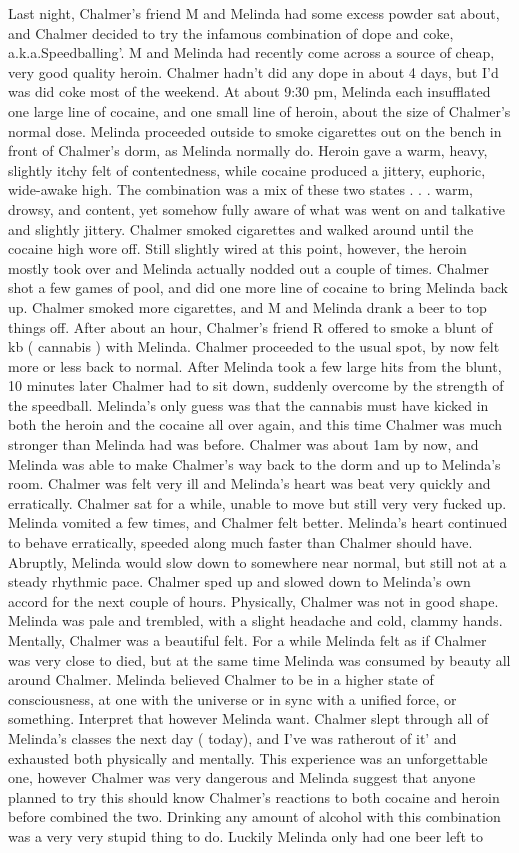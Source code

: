 \documentclass[12pt]{book}
\begin{document}
Last night, Chalmer's friend M and Melinda had some excess powder sat about, and Chalmer decided to try the infamous combination of dope and coke, a.k.a.Speedballing'. M and Melinda had recently come across a source of cheap, very good quality heroin. Chalmer hadn't did any dope in about 4 days, but I'd was did coke most of the weekend. At about 9:30 pm, Melinda each insufflated one large line of cocaine, and one small line of heroin, about the size of Chalmer's normal dose. Melinda proceeded outside to smoke cigarettes out on the bench in front of Chalmer's dorm, as Melinda normally do. Heroin gave a warm, heavy, slightly itchy felt of contentedness, while cocaine produced a jittery, euphoric, wide-awake high. The combination was a mix of these two states . . .  warm, drowsy, and content, yet somehow fully aware of what was went on and talkative and slightly jittery. Chalmer smoked cigarettes and walked around until the cocaine high wore off. Still slightly wired at this point, however, the heroin mostly took over and Melinda actually nodded out a couple of times. Chalmer shot a few games of pool, and did one more line of cocaine to bring Melinda back up. Chalmer smoked more cigarettes, and M and Melinda drank a beer to top things off. After about an hour, Chalmer's friend R offered to smoke a blunt of kb ( cannabis ) with Melinda. Chalmer proceeded to the usual spot, by now felt more or less back to normal. After Melinda took a few large hits from the blunt, 10 minutes later Chalmer had to sit down, suddenly overcome by the strength of the speedball. Melinda's only guess was that the cannabis must have kicked in both the heroin and the cocaine all over again, and this time Chalmer was much stronger than Melinda had was before. Chalmer was about 1am by now, and Melinda was able to make Chalmer's way back to the dorm and up to Melinda's room. Chalmer was felt very ill and Melinda's heart was beat very quickly and erratically. Chalmer sat for a while, unable to move but still very very fucked up. Melinda vomited a few times, and Chalmer felt better. Melinda's heart continued to behave erratically, speeded along much faster than Chalmer should have. Abruptly, Melinda would slow down to somewhere near normal, but still not at a steady rhythmic pace. Chalmer sped up and slowed down to Melinda's own accord for the next couple of hours. Physically, Chalmer was not in good shape. Melinda was pale and trembled, with a slight headache and cold, clammy hands. Mentally, Chalmer was a beautiful felt. For a while Melinda felt as if Chalmer was very close to died, but at the same time Melinda was consumed by beauty all around Chalmer. Melinda believed Chalmer to be in a higher state of consciousness, at one with the universe or in sync with a unified force, or something. Interpret that however Melinda want. Chalmer slept through all of Melinda's classes the next day ( today), and I've was ratherout of it' and exhausted both physically and mentally. This experience was an unforgettable one, however Chalmer was very dangerous and Melinda suggest that anyone planned to try this should know Chalmer's reactions to both cocaine and heroin before combined the two. Drinking any amount of alcohol with this combination was a very very stupid thing to do. Luckily Melinda only had one beer left to 
\end{document}
